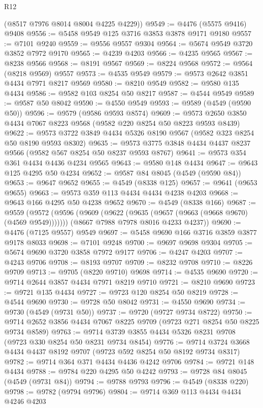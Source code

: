 \begin{lexlean}{R12}
\begin{coremodule}
      (@8517 @7976 @8014 @8004 @4225 @4229))
@9549 := @4476 (@5575 @9416) @9408
@9556 := @5458 @9549 @125 @3716 @3853 @3878 @9171 @9180
@9557 := @7101 @9240
@9559 := @9556 @9557 @9304
@9564 := @5674 @9549 @3720 @3852 @7972 @9170
@9565 := @4239 @4203
@9566 := @4235 @9565
@9567 := @8238 @9566
@9568 := @8191 @9567
@9569 := @8224 @9568
@9572 := @9564 (@8218 @9569) @9557
@9573 := @4535 @9549
@9579 := @9573 @2642 @3851 @4434 @7971 @8217 @9569
@9580 := @8210 @9549
@9582 := @9580 @135 @4434
@9586 := @9582 @103 @8254 @50 @8217
@9587 := @4544 @9549
@9589 := @9587 @50 @8042
@9590 := @4550 @9549
@9593 := @9589 (@4549 (@9590 @50))
@9596 := @9579 (@9586 @9593 @8574)
@9609 := @9573 @2650 @3850 @4434 @7067 @8223 @9568 (@9582 @220 @8254 @50 @8223 @9593 @8439)
@9622 := @9573 @3722 @3849 @4434 @5326 @8190 @9567 (@9582 @323 @8254 @50 @8190 @9593 @8302)
@9635 := @9573 @3775 @3848 @4434 @4437 @8237 @9566 (@9582 @567 @8254 @50 @8237 @9593 @8767)
@9641 := @9573 @354 @361 @4434 @4436 @4234 @9565
@9643 := @9580 @148 @4434
@9647 := @9643 @125 @4295 @50 @4234
@9652 := @9587 @84 @8045 (@4549 (@9590 @84))
@9653 := @9647 @9652
@9655 := @4549 (@8338 @125)
@9657 := @9641 (@9653 @9655)
@9663 := @9573 @359 @113 @4434 @4434 @4238 @4203
@9668 := @9643 @166 @4295 @50 @4238 @9652
@9670 := @4549 (@8338 @166)
@9687 := @9559
    (@9572
      (@9596 (@9609 (@9622 (@9635 (@9657 (@9663 (@9668 @9670) (@4569 @9549)))))))
      (@8667 @7988 @7978 @8016 @4233 @4237))
@9690 := @4476 (@7125 @9557) @9549
@9697 := @5458 @9690 @166 @3716 @3859 @3877 @9178 @8033
@9698 := @7101 @9248
@9700 := @9697 @9698 @9304
@9705 := @5674 @9690 @3720 @3858 @7972 @9177
@9706 := @4247 @4203
@9707 := @4243 @9706
@9708 := @8193 @9707
@9709 := @8232 @9708
@9710 := @8226 @9709
@9713 := @9705 (@8220 @9710) @9698
@9714 := @4535 @9690
@9720 := @9714 @2644 @3857 @4434 @7971 @8219 @9710
@9721 := @8210 @9690
@9723 := @9721 @135 @4434
@9727 := @9723 @120 @8254 @50 @8219
@9728 := @4544 @9690
@9730 := @9728 @50 @8042
@9731 := @4550 @9690
@9734 := @9730 (@4549 (@9731 @50))
@9737 := @9720 (@9727 @9734 @8722)
@9750 := @9714 @2652 @3856 @4434 @7067 @8225 @9709 (@9723 @271 @8254 @50 @8225 @9734 @8589)
@9763 := @9714 @3739 @3855 @4434 @5326 @8231 @9708 (@9723 @330 @8254 @50 @8231 @9734 @8454)
@9776 := @9714 @3724 @3668 @4434 @4437 @8192 @9707 (@9723 @592 @8254 @50 @8192 @9734 @8317)
@9782 := @9714 @364 @371 @4434 @4436 @4242 @9706
@9784 := @9721 @148 @4434
@9788 := @9784 @220 @4295 @50 @4242
@9793 := @9728 @84 @8045 (@4549 (@9731 @84))
@9794 := @9788 @9793
@9796 := @4549 (@8338 @220)
@9798 := @9782 (@9794 @9796)
@9804 := @9714 @369 @113 @4434 @4434 @4246 @4203

\end{coremodule}
\end{lexlean}
